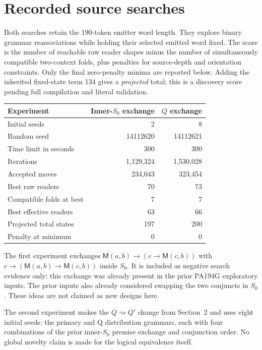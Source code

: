 \documentclass[11pt]{article}
\newcommand{\imp}{\mathbin{\to}}
\newcommand{\M}{\mathsf M}
\begin{document}
\section{Recorded source searches}

Both searches retain the 190-token emitter word length. They explore
binary grammar reassociations while holding their selected emitted
word fixed. The score is the number of reachable raw reader shapes minus
the number of simultaneously compatible two-context folds, plus penalties
for source-depth and orientation constraints. Only the final
zero-penalty minima are reported below. Adding the inherited fixed-state
term 134 gives a \emph{projected} total; this is a discovery score pending
full compilation and literal validation.

\begin{center}
\begin{tabular}{@{}lrr@{}}
\toprule
Experiment & Inner-$S_0$ exchange & $Q$ exchange\\
\midrule
Initial seeds & 2 & 8\\
Random seed & 14112620 & 14112621\\
Time limit in seconds & 300 & 300\\
Iterations & 1,129,324 & 1,530,028\\
Accepted moves & 234,043 & 323,454\\
Best raw readers & 70 & 73\\
Compatible folds at best & 7 & 7\\
Best effective readers & 63 & 66\\
Projected total states & 197 & 200\\
Penalty at minimum & 0 & 0\\
\bottomrule
\end{tabular}
\end{center}

The first experiment exchanges
$\M(a,b)\imp(c\imp\M(c,b))$ with
$c\imp(\M(a,b)\imp\M(c,b))$ inside $S_0$.
It is included as negative search evidence only: this exchange was
already present in the prior PA194G exploratory inputs. The prior inputs
also already considered swapping the two conjuncts in $S_0$.
These ideas are not claimed as new designs here.

The second experiment makes the $Q\rightsquigarrow Q'$ change from
Section~2 and uses eight initial seeds: the primary and Q distribution
grammars, each with four combinations of the prior inner-$S_0$ premise
exchange and conjunction order. No global novelty claim is made for
the logical equivalence itself.
\end{document}
